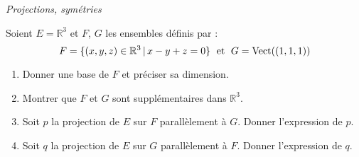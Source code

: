 \documentclass[a4paper,10pt]{report}
\begin{document}
\medskip

\begin{center}
\textit{{ {\large Projections, symétries}}}
\end{center}

\medskip


\begin{Exa} Soient $E= \mathbb{R}^3$ et $F$, $G$ les ensembles définis par :
$$ F = \lbrace (x,y,z) \in \mathbb{R}^3 \, \vert \, x-y+z=0 \rbrace \; \hbox{ et }  \; G = \textrm{Vect}((1,1,1)) $$

\begin{enumerate}
\item Donner une base de $F$ et préciser sa dimension.
\item Montrer que $F$ et $G$ sont supplémentaires dans $\mathbb{R}^3$.
\item Soit $p$ la projection de $E$ sur $F$ parallèlement à $G$. Donner l'expression de $p$.
\item Soit $q$ la projection de $E$ sur $G$ parallèlement à $F$. Donner l'expression de $q$.
\end{enumerate}
\end{Exa}

\corr  
\end{document}
